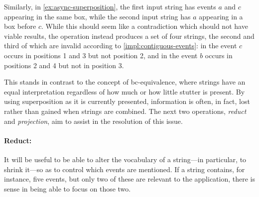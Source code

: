 \documentclass[a4paper,12pt,leqno]{article}
\newcommand{\bc}{{\rm b\!c}}
\newcommand{\vph}[1]{\vphantom{#1}}
\newcommand{\ebox}[1]{\fbox{$\vph{'(),}#1$}}
\newcommand{\EventString}[1]{%
	\renewcommand*{\do}[1]{\ebox{##1}}%
	\PipeParser{#1}%
}
\begin{document}
Similarly, in \cref{ex:async-superposition}, the first input string has events $a$ and $c$ appearing in the same box, while the second input string has $a$ appearing in a box before $c$. While this should seem like a contradiction which should not have viable results, the operation instead produces a set of four strings, the second and third of which are invalid according to \cref{impl:contiguous-events}: in \EventString{a,c|a,b,d|b,c,d} the event $c$ occurs in positions 1 and 3 but not position 2, and in \EventString{a,c|a,b,c|a,c,d|b,c,d} the event $b$ occurs in positions 2 and 4 but not in position 3.

This stands in contrast to the concept of \bc-equivalence, where strings have an equal interpretation regardless of how much or how little stutter is present. By using superposition as it is currently presented, information is often, in fact, lost rather than gained when strings are combined. The next two operations, \textit{reduct} and \textit{projection}, aim to assist in the resolution of this issue.

\paragraph{Reduct:}\label{para:str-op-reduct}
It will be useful to be able to alter the vocabulary of a string---in particular, to shrink it---so as to control which events are mentioned. If a string contains, for instance, five events, but only two of these are relevant to the application, there is sense in being able to focus on those two.
\end{document}
